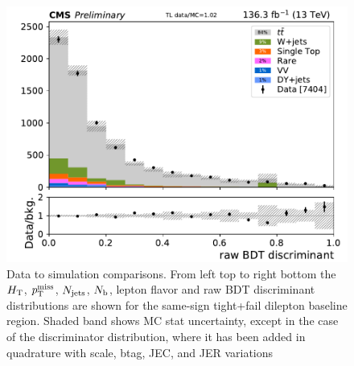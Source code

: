 \begin{figure}[!htb]
\includegraphics[width=0.45\linewidth]{figs/ftan/cr/run2_tl_eventbdt_in.pdf} 
\caption{ Data to simulation comparisons. From left top to right bottom
  the $H_{\mathrm{T}}$, $p_{\mathrm{T}}^\text{miss}$, $N_\text{jets}$, $N_\mathrm{b}$, lepton flavor and raw BDT discriminant distributions are
shown for the same-sign tight+fail dilepton baseline region. Shaded band shows MC stat uncertainty,
except in the case of the discriminator distribution, where it has been added in quadrature with
    scale, btag, JEC, and JER variations}
\label{fig:TightFailBaselineRun2}
\end{figure}


